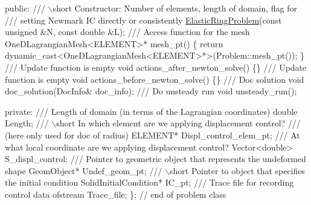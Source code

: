 \begin{DoxyCodeInclude}
\textcolor{keyword}{public}:
\textcolor{comment}{}
\textcolor{comment}{ /// \(\backslash\)short Constructor: Number of elements, length of domain, flag for}
\textcolor{comment}{ /// setting Newmark IC directly or consistently}
\textcolor{comment}{} \hyperlink{classElasticRingProblem}{ElasticRingProblem}(\textcolor{keyword}{const} \textcolor{keywordtype}{unsigned} &N, \textcolor{keyword}{const} \textcolor{keywordtype}{double} &L);
                    \textcolor{comment}{}
\textcolor{comment}{ /// Access function for the mesh}
\textcolor{comment}{} OneDLagrangianMesh<ELEMENT>* mesh\_pt() 
  \{
   \textcolor{keywordflow}{return} \textcolor{keyword}{dynamic\_cast<}OneDLagrangianMesh<ELEMENT>*\textcolor{keyword}{>}(Problem::mesh\_pt());
  \}
\textcolor{comment}{}
\textcolor{comment}{ /// Update function is empty }
\textcolor{comment}{} \textcolor{keywordtype}{void} actions\_after\_newton\_solve() \{\}
\textcolor{comment}{}
\textcolor{comment}{ /// Update function is empty }
\textcolor{comment}{} \textcolor{keywordtype}{void} actions\_before\_newton\_solve() \{\}
\textcolor{comment}{}
\textcolor{comment}{ /// Doc solution}
\textcolor{comment}{} \textcolor{keywordtype}{void} doc\_solution(DocInfo& doc\_info);
\textcolor{comment}{}
\textcolor{comment}{ /// Do unsteady run}
\textcolor{comment}{} \textcolor{keywordtype}{void} unsteady\_run();

\textcolor{keyword}{private}:
\textcolor{comment}{}
\textcolor{comment}{ /// Length of domain (in terms of the Lagrangian coordinates)}
\textcolor{comment}{} \textcolor{keywordtype}{double} Length;
\textcolor{comment}{}
\textcolor{comment}{ /// \(\backslash\)short In which element are we applying displacement control?}
\textcolor{comment}{ /// (here only used for doc of radius)}
\textcolor{comment}{} ELEMENT* Displ\_control\_elem\_pt;
\textcolor{comment}{}
\textcolor{comment}{ /// At what local coordinate are we applying displacement control?}
\textcolor{comment}{} Vector<double> S\_displ\_control;
\textcolor{comment}{}
\textcolor{comment}{ /// Pointer to geometric object that represents the undeformed shape}
\textcolor{comment}{} GeomObject* Undef\_geom\_pt;
\textcolor{comment}{}
\textcolor{comment}{ /// \(\backslash\)short Pointer to object that specifies the initial condition}
\textcolor{comment}{} SolidInitialCondition* IC\_pt;
\textcolor{comment}{}
\textcolor{comment}{ /// Trace file for recording control data}
\textcolor{comment}{} ofstream Trace\_file;
\}; \textcolor{comment}{// end of problem class}





\end{DoxyCodeInclude}
